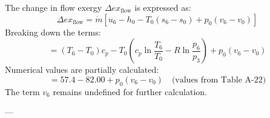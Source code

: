 The change in flow exergy \( \Delta ex_{\text{flow}} \) is expressed as:  
\[
\Delta ex_{\text{flow}} = \dot{m} \left[ u_6 - h_0 - T_0 (s_6 - s_0) + p_0 (v_6 - v_0) \right]
\]  
Breaking down the terms:  
\[
= (T_6 - T_0) c_p - T_0 \left( c_p \ln \frac{T_6}{T_0} - R \ln \frac{p_6}{p_3} \right) + p_0 (v_6 - v_0)
\]  
Numerical values are partially calculated:  
\[
= 57.4 - 82.00 + p_0 (v_6 - v_0) \quad \text{(values from Table A-22)}
\]  
The term \( v_6 \) remains undefined for further calculation.

---